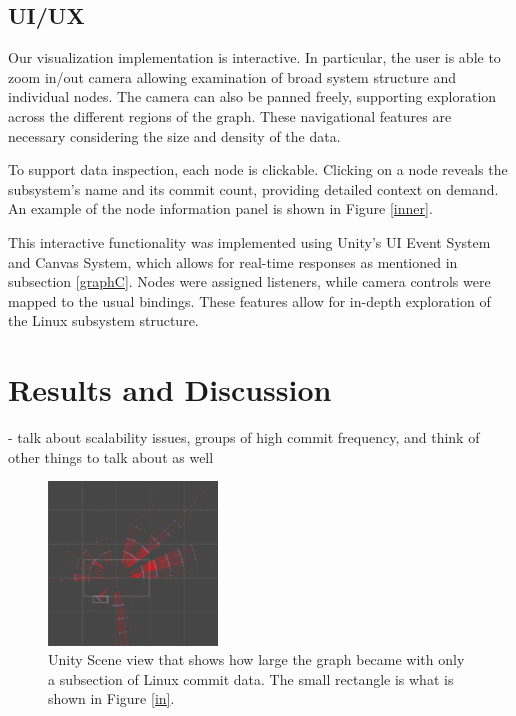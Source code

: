 \documentclass[conference]{IEEEtran}
\begin{document}
\subsection{UI/UX}
Our visualization implementation is interactive. In particular, the user is able to zoom in/out camera allowing examination of broad system structure and individual nodes. The camera can also be panned freely, supporting exploration across the different regions of the graph. These navigational features are necessary considering the size and density of the data. 

To support data inspection, each node is clickable. Clicking on a node reveals the subsystem’s name and its commit count, providing detailed context on demand. An example of the node information panel is shown in Figure \ref{inner}.

This interactive functionality was implemented using Unity's UI Event System and Canvas System, which allows for real-time responses as mentioned in subsection \ref{graphC}. Nodes were assigned listeners, while camera controls were mapped to the usual bindings. These features allow for in-depth exploration of the Linux subsystem structure.





\section{Results and Discussion}
\label{resAndDisc}

- talk about scalability issues, groups of high commit frequency, and think of other things to talk about as well

\begin{figure}[h!]
	\centering
	\includegraphics[width=0.4\textwidth]{wholeThingMostly.png}
	\caption{Unity Scene view that shows how large the graph became with only a subsection of Linux commit data. The small rectangle is what is shown in Figure \ref{in}.}
	\label{out}
\end{figure}
\end{document}
